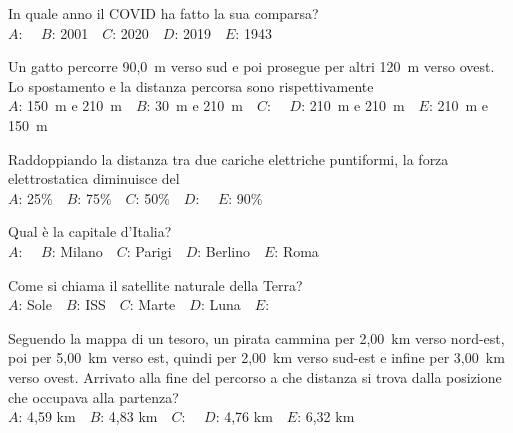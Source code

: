 \mcquestionfooter



\def\mcquestionnumber{2}


\mcquestionheader In quale anno il COVID ha fatto la sua comparsa?\\
{$A$}: \ \ {$B$}: 2001\ \ {$C$}: 2020\ \ {$D$}: 2019\ \ {$E$}: 1943\ \ 

\mcquestionfooter



\def\mcquestionnumber{3}


\mcquestionheader Un gatto percorre 90,0~m verso sud e poi prosegue per altri 120~m verso ovest. Lo spostamento e la distanza percorsa sono rispettivamente\\
{$A$}: 150~m e 210~m\ \ {$B$}: 30~m e 210~m\ \ {$C$}: \ \ {$D$}: 210~m e 210~m\ \ {$E$}: 210~m e 150~m\ \ 

\mcquestionfooter



\def\mcquestionnumber{4}


\mcquestionheader Raddoppiando la distanza tra due cariche elettriche puntiformi, la forza elettrostatica diminuisce del\\
{$A$}: 25\%\ \ {$B$}: 75\%\ \ {$C$}: 50\%\ \ {$D$}: \ \ {$E$}: 90\%\ \ 

\mcquestionfooter



\def\mcquestionnumber{5}


\mcquestionheader Qual è la capitale d’Italia?\\
{$A$}: \ \ {$B$}: Milano\ \ {$C$}: Parigi\ \ {$D$}: Berlino\ \ {$E$}: Roma\ \ 

\mcquestionfooter



\def\mcquestionnumber{6}


\mcquestionheader Come si chiama il satellite naturale della Terra?\\
{$A$}: Sole\ \ {$B$}: ISS\ \ {$C$}: Marte\ \ {$D$}: Luna\ \ {$E$}: \ \ 

\mcquestionfooter



\def\mcquestionnumber{7}


\mcquestionheader Seguendo la mappa di un tesoro, un pirata cammina per 2,00~km verso nord-est, poi per 5,00~km verso est, quindi per 2,00~km verso sud-est e infine per 3,00~km verso ovest. Arrivato alla fine del percorso a che distanza si trova dalla posizione che occupava alla partenza?\\
{$A$}: 4,59 km\ \ {$B$}: 4,83 km\ \ {$C$}: \ \ {$D$}: 4,76 km\ \ {$E$}: 6,32 km\ \ 


